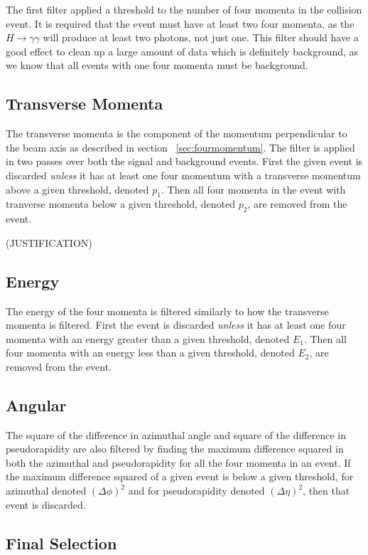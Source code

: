 \documentclass[11pt]{amsart}
\begin{document}
\begin{multicols}{2}
The first filter applied a threshold to the number of four momenta in the collision event. It is required that the event must have at least two four momenta, as the $H \to \gamma\gamma$ will produce at least two photons, not just one. This filter should have a good effect to clean up a large amount of data which is definitely background, as we know that all events with one four momenta must be background.

\subsection{Transverse Momenta}

The transverse momenta is the component of the momentum perpendicular to the beam axis as described in section ~\ref{sec:fourmomentum}. The filter is applied in two passes over both the signal and background events. First the given event is discarded \textit{unless} it has at least one four momentum with a transverse momentum above a given threshold, denoted $p_1$. Then all four momenta in the event with tranverse momenta below a given threshold, denoted $p_2$, are removed from the event.

(JUSTIFICATION)

\subsection{Energy}

The energy of the four momenta is filtered similarly to how the transverse momenta is filtered. First the event is discarded \textit{unless} it has at least one four momenta with an energy greater than a given threshold, denoted $E_1$. Then all four momenta with an energy less than a given threshold, denoted $E_2$, are removed from the event.

\subsection{Angular}

The square of the difference in azimuthal angle and square of the difference in pseudorapidity are also filtered by finding the maximum difference squared in both the azimuthal and pseudorapidity for all the four momenta in an event. If the maximum difference squared of a given event is below a given threshold, for azimuthal denoted ${(\Delta \phi)}^2$ and for pseudorapidity denoted ${(\Delta \eta)}^2$, then that event is discarded.

\subsection{Final Selection}


\end{multicols}
\end{document}

